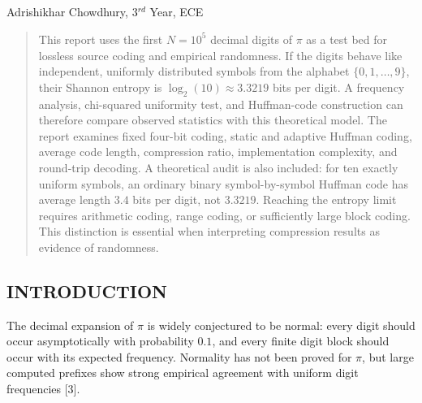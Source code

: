 \vspace{-14pt}
\begin{center}
  \section{}
  \vspace*{-6pt}Adrishikhar Chowdhury, 3$^{rd}$ Year, ECE
\end{center}

\setcounter{figure}{0}
\setcounter{table}{0}

\begingroup\setlength{\premulticols}{28pt}
\begin{multicols}{2}
  \begin{abstract}
    \bfseries
    { This report uses the first $N=10^5$ decimal digits of $\pi$ as a test bed for lossless source coding and empirical randomness. If the digits behave like independent, uniformly distributed symbols from the alphabet $\{0,1,\ldots,9\}$, their Shannon entropy is $\log_2(10)\approx3.3219$ bits per digit. A frequency analysis, chi-squared uniformity test, and Huffman-code construction can therefore compare observed statistics with this theoretical model. The report examines fixed four-bit coding, static and adaptive Huffman coding, average code length, compression ratio, implementation complexity, and round-trip decoding. A theoretical audit is also included: for ten exactly uniform symbols, an ordinary binary symbol-by-symbol Huffman code has average length $3.4$ bits per digit, not $3.3219$. Reaching the entropy limit requires arithmetic coding, range coding, or sufficiently large block coding. This distinction is essential when interpreting compression results as evidence of randomness.\par}
  \end{abstract}

  \subsection*{\centering\uppercase{Introduction}}
  { The decimal expansion of $\pi$ is widely conjectured to be normal: every digit should occur asymptotically with probability $0.1$, and every finite digit block should occur with its expected frequency. Normality has not been proved for $\pi$, but large computed prefixes show strong empirical agreement with uniform digit frequencies [3].\par}


\end{multicols}
